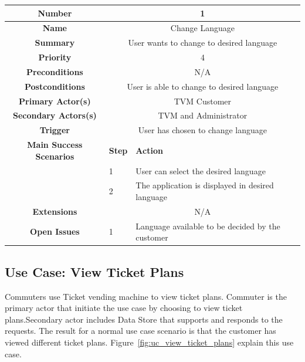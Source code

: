 \documentclass[a4paper,12pt]{report}
\begin{document}
\begin{tabular}{ | c | p{2cm} | p{7cm} |}
	
	\hline
	\textbf{Number} & \multicolumn{2}{c|}{1}  \\
	\hline
	\textbf{Name} & \multicolumn{2}{c|}{Change Language}  \\
	\hline
	\textbf{Summary} & \multicolumn{2}{c|}{User wants to change to desired language }  \\
	\hline
	\textbf{Priority} & \multicolumn{2}{c|}{4}  \\
	\hline
	\textbf{Preconditions} & \multicolumn{2}{c|}{N/A}  \\
	\hline
	\textbf{Postconditions} & \multicolumn{2}{c|}{User is able to change to desired language}  \\
	\hline
	\textbf{Primary Actor(s)} & \multicolumn{2}{c|}{TVM Customer}  \\
	\hline
	\textbf{Secondary Actors(s)} & \multicolumn{2}{c|}{TVM and Administrator}  \\
	\hline
	\textbf{Trigger} & \multicolumn{2}{c|}{User has chosen to change language}  \\
	\hline
	\textbf{Main Success Scenarios} & \textbf{Step} & \textbf{Action} \\
	\hline
	  & 1 & User can select the desired language \\ 
	\hline
	  &  2  & The application is displayed in desired language \\
	\hline
	\textbf{Extensions} & \multicolumn{2}{c|}{N/A}  \\
	\hline
	\textbf{Open Issues} &  1  & Language available to be decided by the customer \\
	\hline
\end{tabular}



\FloatBarrier

\subsection{Use Case: View Ticket Plans}
Commuters use Ticket vending machine to view ticket plans. Commuter is the primary actor that initiate the use case by choosing to view ticket plans.Secondary actor includes Data Store that supports and responds to the requests. The result for a normal use case scenario is that the customer has viewed different ticket plans. Figure~\ref{fig:uc_view_ticket_plans} explain this use case. \\
\end{document}

